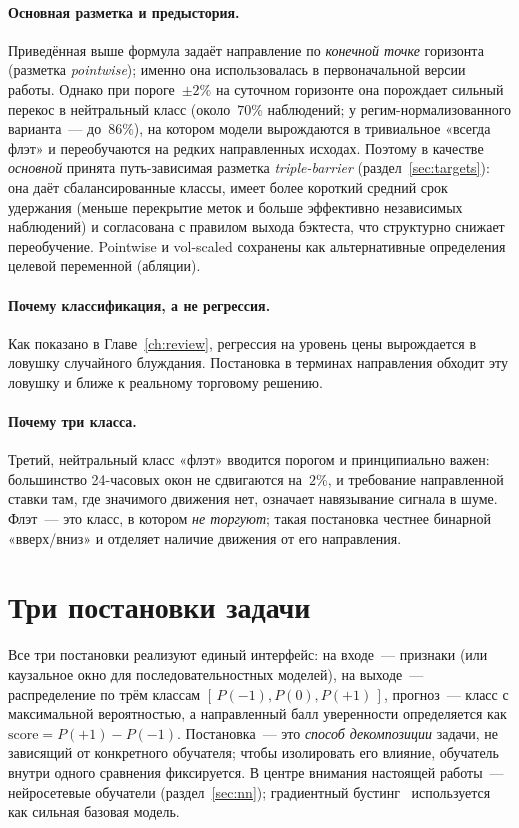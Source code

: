 \documentclass[12pt,a4paper]{report}
\begin{document}
\paragraph{Основная разметка и предыстория.} Приведённая выше формула задаёт
направление по \emph{конечной точке} горизонта (разметка \emph{pointwise}); именно
она использовалась в первоначальной версии работы. Однако при пороге~$\pm 2\%$ на
суточном горизонте она порождает сильный перекос в нейтральный класс (около~$70\%$
наблюдений; у регим-нормализованного варианта~--- до~$86\%$), на котором модели
вырождаются в тривиальное «всегда флэт» и переобучаются на редких направленных
исходах. Поэтому в качестве \emph{основной} принята путь-зависимая разметка
\emph{triple-barrier} (раздел~\ref{sec:targets}): она даёт сбалансированные классы,
имеет более короткий средний срок удержания (меньше перекрытие меток и больше
эффективно независимых наблюдений) и согласована с правилом выхода бэктеста, что
структурно снижает переобучение. Pointwise и vol-scaled сохранены как
альтернативные определения целевой переменной (абляции).

\paragraph{Почему классификация, а не регрессия.} Как показано в
Главе~\ref{ch:review}, регрессия на уровень цены вырождается в ловушку случайного
блуждания. Постановка в терминах направления обходит эту ловушку и ближе к
реальному торговому решению.

\paragraph{Почему три класса.} Третий, нейтральный класс «флэт» вводится порогом и
принципиально важен: большинство 24-часовых окон не сдвигаются на~$2\%$, и
требование направленной ставки там, где значимого движения нет, означает навязывание
сигнала в шуме. Флэт~--- это класс, в котором \emph{не торгуют}; такая постановка
честнее бинарной «вверх/вниз» и отделяет наличие движения от его направления.

\section{Три постановки задачи}

Все три постановки реализуют единый интерфейс: на входе~--- признаки (или каузальное
окно для последовательностных моделей), на выходе~--- распределение по трём классам
$[\,P(-1),P(0),P(+1)\,]$, прогноз~--- класс с максимальной вероятностью, а
направленный балл уверенности определяется как $\mathrm{score}=P(+1)-P(-1)$.
Постановка~--- это \emph{способ декомпозиции} задачи, не зависящий от конкретного
обучателя; чтобы изолировать его влияние, обучатель внутри одного сравнения
фиксируется. В центре внимания настоящей работы~--- нейросетевые обучатели
(раздел~\ref{sec:nn}); градиентный бустинг~\cite{ke2017} используется как сильная
базовая модель.
\end{document}
